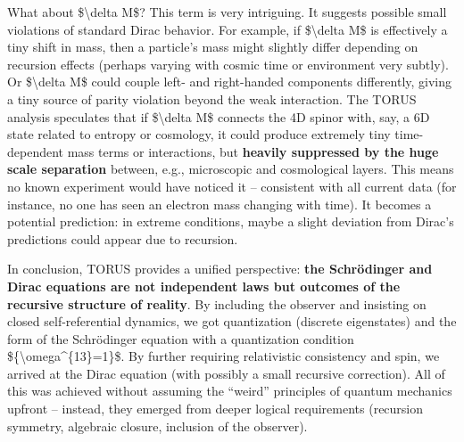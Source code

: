 \documentclass[
]{article}
\begin{document}
What about \$\textbackslash delta M\$? This term is very intriguing. It
suggests possible small violations of standard Dirac behavior. For
example, if \$\textbackslash delta M\$ is effectively a tiny shift in
mass, then a particle's mass might slightly differ depending on
recursion effects (perhaps varying with cosmic time or environment very
subtly). Or \$\textbackslash delta M\$ could couple left- and
right-handed components differently, giving a tiny source of parity
violation beyond the weak interaction. The TORUS analysis speculates
that if \$\textbackslash delta M\$ connects the 4D spinor with, say, a
6D state related to entropy or cosmology, it could produce extremely
tiny time-dependent mass terms or interactions, but \textbf{heavily
suppressed by the huge scale separation} between, e.g., microscopic and
cosmological layers\hspace{0pt}. This means no known experiment would
have noticed it -- consistent with all current data (for instance, no
one has seen an electron mass changing with time). It becomes a
potential prediction: in extreme conditions, maybe a slight deviation
from Dirac's predictions could appear due to recursion.

In conclusion, TORUS provides a unified perspective: \textbf{the
Schrödinger and Dirac equations are not independent laws but outcomes of
the recursive structure of reality}. By including the observer and
insisting on closed self-referential dynamics, we got quantization
(discrete eigenstates) and the form of the Schrödinger equation with a
quantization condition
\$\{\textbackslash omega\^{}\{13\}=1\}\$\hspace{0pt}. By further
requiring relativistic consistency and spin, we arrived at the Dirac
equation (with possibly a small recursive correction)\hspace{0pt}. All
of this was achieved without assuming the ``weird'' principles of
quantum mechanics upfront -- instead, they emerged from deeper logical
requirements (recursion symmetry, algebraic closure, inclusion of the
observer).
\end{document}
